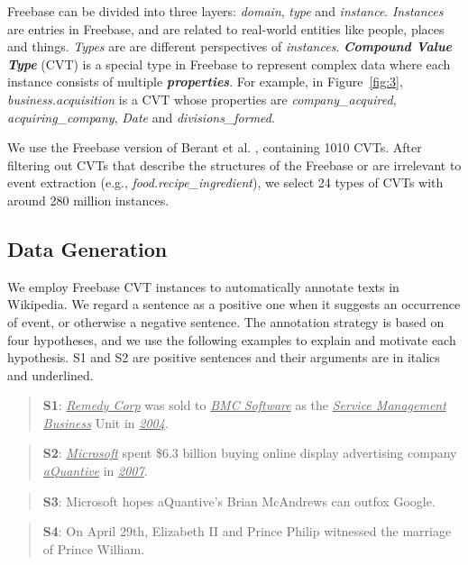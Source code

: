 \documentclass{article}
\begin{document}
Freebase can be divided into three layers: \emph{domain}, \emph{type} and \emph{instance}. \emph{Instances} are entries in Freebase, and are related to real-world entities like people, places and things. \emph{Types} are are different perspectives of \emph{instances}. 
\textbf{\emph{Compound Value Type}} (CVT) is a special type in Freebase to represent complex data where each instance consists of multiple \textbf{\emph{properties}}. For example, in Figure~\ref{fig:3}, \emph{business.acquisition} is a CVT whose properties are \emph{company\_acquired}, \emph{acquiring\_company}, \emph{Date} and \emph{divisions\_formed}. 

We use the Freebase version of Berant et al. , containing 1010 CVTs. After filtering out CVTs that describe the structures of the Freebase or are irrelevant to event extraction (e.g., \emph{food.recipe\_ingredient}), we select 24 types of CVTs with around 280 million instances.

\subsection{Data Generation\label{datagen}}
We employ Freebase CVT instances to automatically annotate texts in Wikipedia. We regard a sentence as a positive one when it suggests an occurrence of event, or otherwise a negative sentence. The annotation strategy is based on four hypotheses, and we use the following examples to explain and motivate each hypothesis. S1 and S2 are positive sentences and their arguments are in italics and underlined.

\begin{quote}
	\textbf{S1}: \underline{\emph{Remedy Corp}} was sold to \underline{\emph{BMC Software}} as the \underline{\emph{Service Management Business}} Unit in \underline{\emph{2004}}.
\end{quote}
\begin{quote}
	\textbf{S2}: \underline{\emph{Microsoft}} spent \$6.3 billion buying online display advertising company \underline{\emph{aQuantive}} in \underline{\emph{2007}}.
\end{quote}
\begin{quote}
	\textbf{S3}: Microsoft hopes aQuantive’s Brian McAndrews can outfox Google.
\end{quote}
\begin{quote}
	\textbf{S4}: On April 29th, Elizabeth II and Prince Philip witnessed the marriage of Prince William.
\end{quote}
\end{document}
